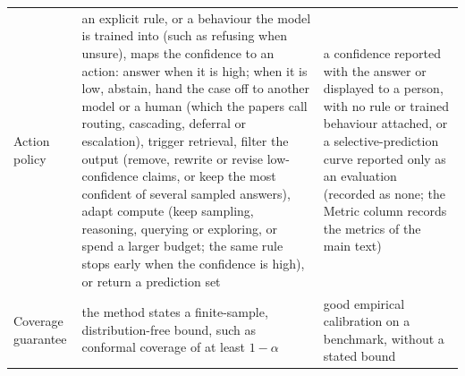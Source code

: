 {\begin{longtable}{@{}>{\raggedright\arraybackslash}p{}
                   >{\raggedright\arraybackslash}p{}
                   >{\raggedright\arraybackslash}p{}@{}}
Action policy & an explicit rule, or a behaviour the model is trained into (such as refusing when unsure), maps the confidence to an action: answer when it is high; when it is low, abstain, hand the case off to another model or a human (which the papers call routing, cascading, deferral or escalation), trigger retrieval, filter the output (remove, rewrite or revise low-confidence claims, or keep the most confident of several sampled answers), adapt compute (keep sampling, reasoning, querying or exploring, or spend a larger budget; the same rule stops early when the confidence is high), or return a prediction set & a confidence reported with the answer or displayed to a person, with no rule or trained behaviour attached, or a selective-prediction curve reported only as an evaluation (recorded as none; the Metric column records the metrics of the main text) \\
Coverage guarantee & the method states a finite-sample, distribution-free bound, such as conformal coverage of at least $1-\alpha$~\citep{campos2024conformal} & good empirical calibration on a benchmark, without a stated bound \\
\end{longtable}}
